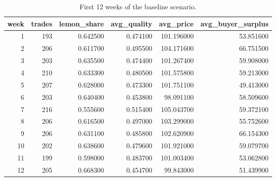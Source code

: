 \begin{table}
\caption{First 12 weeks of the baseline scenario.}
\label{tab:baseline_first12weeks}
\begin{tabular}{rrrrrr}
\toprule
week & trades & lemon\_share & avg\_quality & avg\_price & avg\_buyer\_surplus \\
\midrule
1 & 193 & 0.642500 & 0.474100 & 101.196000 & 53.851600 \\
2 & 206 & 0.611700 & 0.495500 & 104.171600 & 66.751500 \\
3 & 203 & 0.635500 & 0.474400 & 101.267400 & 59.908000 \\
4 & 210 & 0.633300 & 0.480500 & 101.575800 & 59.213000 \\
5 & 207 & 0.628000 & 0.473300 & 101.751100 & 49.413000 \\
6 & 203 & 0.640400 & 0.453800 & 98.091100 & 58.509600 \\
7 & 216 & 0.555600 & 0.515400 & 105.043700 & 59.372100 \\
8 & 206 & 0.616500 & 0.497000 & 103.299000 & 55.752600 \\
9 & 206 & 0.631100 & 0.485800 & 102.620900 & 66.154300 \\
10 & 202 & 0.638600 & 0.479600 & 101.921000 & 59.079700 \\
11 & 199 & 0.598000 & 0.483700 & 101.003400 & 53.062800 \\
12 & 205 & 0.668300 & 0.454700 & 99.843000 & 51.439900 \\
\bottomrule
\end{tabular}
\end{table}
